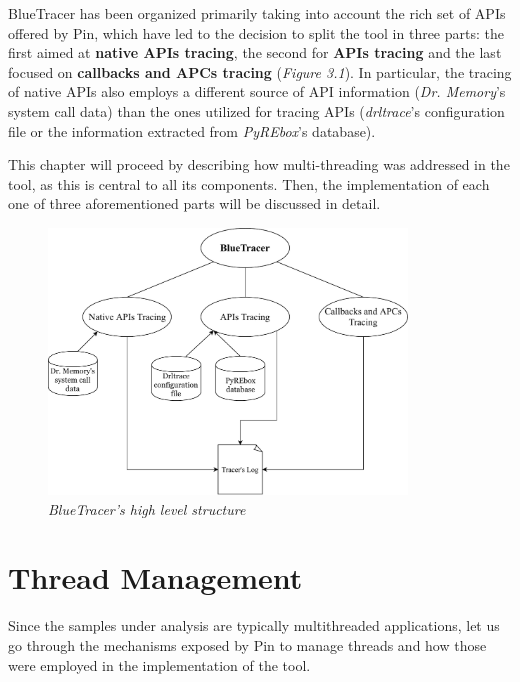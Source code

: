 BlueTracer has been organized primarily taking into account the rich set of APIs offered by Pin, which have led to the decision to split the tool in three parts: the first aimed at \textbf{native APIs tracing}, the second for \textbf{APIs tracing} and the last focused on \textbf{callbacks and APCs tracing} (\textit{Figure 3.1}). In particular, the tracing of native APIs also employs a different source of API information (\textit{Dr. Memory}'s system call data) than the ones utilized for tracing APIs (\textit{drltrace}'s configuration file or the information extracted from \textit{PyREbox}'s database).

This chapter will proceed by describing how multi-threading was addressed in the tool, as this is central to all its components. Then, the implementation of each one of three aforementioned parts will be discussed in detail. 

\begin{figure}[h]
\centering
\includegraphics[width=0.85\textwidth]{Figures/BlueTracer.pdf}
\caption{\textit{BlueTracer's high level structure}}
\end{figure}

\section{Thread Management}

Since the samples under analysis are typically multithreaded applications, let us go through the mechanisms exposed by Pin to manage threads and how those were employed in the implementation of the tool.

